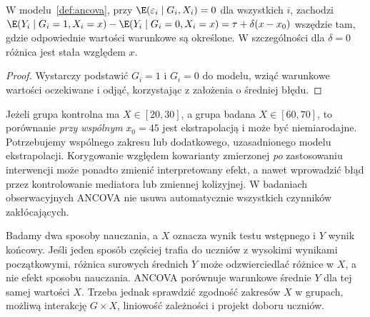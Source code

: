 \begin{stwierdzenie}\label{prop:ancova-contrast}
W modelu~\ref{def:ancova}, przy $\E(\varepsilon_i\mid G_i,X_i)=0$ dla wszystkich $i$, zachodzi
$\E(Y_i\mid G_i=1,X_i=x)-\E(Y_i\mid G_i=0,X_i=x)=\tau+\delta(x-x_0)$
wszędzie tam, gdzie odpowiednie wartości warunkowe są określone. W szczególności dla $\delta=0$ różnica jest stała względem $x$.
\end{stwierdzenie}
\begin{proof}
Wystarczy podstawić $G_i=1$ i $G_i=0$ do modelu, wziąć warunkowe wartości oczekiwane i odjąć, korzystając z założenia o średniej błędu.
\end{proof}

\begin{uwaga}
Jeżeli grupa kontrolna ma $X\in[20,30]$, a grupa badana $X\in[60,70]$, to porównanie \emph{przy wspólnym} $x_0=45$ jest ekstrapolacją i może być niemiarodajne. Potrzebujemy wspólnego zakresu lub dodatkowego, uzasadnionego modelu ekstrapolacji. Korygowanie względem kowarianty zmierzonej \emph{po} zastosowaniu interwencji może ponadto zmienić interpretowany efekt, a nawet wprowadzić błąd przez kontrolowanie mediatora lub zmiennej kolizyjnej. W badaniach obserwacyjnych ANCOVA nie usuwa automatycznie wszystkich czynników zakłócających.
\end{uwaga}

\begin{przyklad}
Badamy dwa sposoby nauczania, a $X$ oznacza wynik testu wstępnego i $Y$ wynik końcowy. Jeśli jeden sposób częściej trafia do uczniów z wysokimi wynikami początkowymi, różnica surowych średnich $Y$ może odzwierciedlać różnice w $X$, a nie efekt sposobu nauczania. ANCOVA porównuje warunkowe średnie $Y$ dla tej samej wartości $X$. Trzeba jednak sprawdzić zgodność zakresów $X$ w grupach, możliwą interakcję $G\times X$, liniowość zależności i projekt doboru uczniów.
\end{przyklad}


